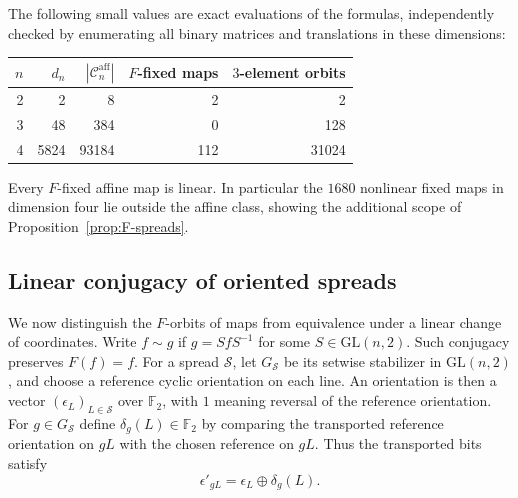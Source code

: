\documentclass[11pt]{article}
\begin{document}
The following small values are exact evaluations of the formulas, independently
checked by enumerating all binary matrices and translations in these dimensions:
\begin{center}
\begin{tabular}{r|r|r|r|r}
$n$ & $d_n$ & $|\mathcal C_n^{\mathrm{aff}}|$ & $F$-fixed maps & $3$-element orbits\\
\hline
2 & 2 & 8 & 2 & 2\\
3 & 48 & 384 & 0 & 128\\
4 & 5824 & 93184 & 112 & 31024\\
\end{tabular}
\end{center}
Every $F$-fixed affine map is linear. In particular the $1680$ nonlinear fixed
maps in dimension four lie outside the affine class, showing the additional
scope of Proposition~\ref{prop:F-spreads}.

\subsection*{Linear conjugacy of oriented spreads}
We now distinguish the $F$-orbits of maps from equivalence under a linear
change of coordinates. Write $f\sim g$ if $g=SfS^{-1}$ for some
$S\in\mathrm{GL}(n,2)$. Such conjugacy preserves $F(f)=f$.
For a spread $\mathcal S$, let $G_{\mathcal S}$ be its setwise stabilizer
in $\mathrm{GL}(n,2)$, and choose a reference cyclic orientation on each line.
An orientation is then a vector $(\epsilon_L)_{L\in\mathcal S}$ over $\mathbb F_2$,
with $1$ meaning reversal of the reference orientation.
For $g\in G_{\mathcal S}$ define $\delta_g(L)\in\mathbb F_2$ by comparing the
transported reference orientation on $gL$ with the chosen reference on $gL$.
Thus the transported bits satisfy
\[
\epsilon'_{gL}=\epsilon_L\oplus\delta_g(L).
\]
\end{document}
